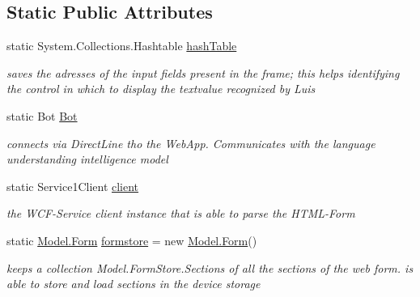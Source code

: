 \subsection*{Static Public Attributes}
\begin{DoxyCompactItemize}
\item 
static System.\+Collections.\+Hashtable \hyperlink{class_listen_to_me_1_1_app_a311ccaa1ae0fd9cf9f89d3e3466098fe}{hash\+Table}
\begin{DoxyCompactList}\small\item\em saves the adresses of the input fields present in the frame; this helps identifying the control in which to display the textvalue recognized by Luis \end{DoxyCompactList}\item 
static Bot \hyperlink{class_listen_to_me_1_1_app_a2862b032c76095016dd7dc7600bfd029}{Bot}
\begin{DoxyCompactList}\small\item\em connects via Direct\+Line tho the Web\+App. Communicates with the language understanding intelligence model \end{DoxyCompactList}\item 
static Service1\+Client \hyperlink{class_listen_to_me_1_1_app_a41b762ac78fada5d35954d39419b8e36}{client}
\begin{DoxyCompactList}\small\item\em the W\+C\+F-\/\+Service client instance that is able to parse the H\+T\+M\+L-\/\+Form \end{DoxyCompactList}\item 
static \hyperlink{class_listen_to_me_1_1_model_1_1_form}{Model.\+Form} \hyperlink{class_listen_to_me_1_1_app_a3e094e220103fe4590cf50c22f38ee65}{formstore} = new \hyperlink{class_listen_to_me_1_1_model_1_1_form}{Model.\+Form}()
\begin{DoxyCompactList}\small\item\em keeps a collection Model.\+Form\+Store.\+Sections of all the sections of the web form. is able to store and load sections in the device storage \end{DoxyCompactList}\end{DoxyCompactItemize}
